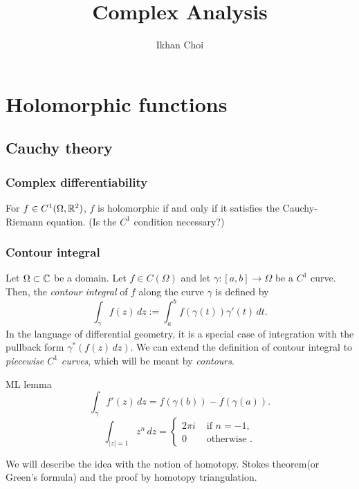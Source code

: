 \documentclass{../note}
\begin{document}
\title{Complex Analysis}
\author{Ikhan Choi}
\maketitle
\tableofcontents


\part{Holomorphic functions}


\chapter{Cauchy theory}
\section{Complex differentiability}


\begin{prb}
\begin{parts}
\item For $f\in C^1(\Omega,\mathbb{R}^2)$, $f$ is holomorphic if and only if it satisfies the Cauchy-Riemann equation. (Is the $C^1$ condition necessary?)
\end{parts}
\end{prb}


\section{Contour integral}

\begin{prb}
Let $\Omega\subset\mathbb{C}$ be a domain.
Let $f\in C(\Omega)$ and let $\gamma:[a,b]\to\Omega$ be a $C^1$ curve.
Then, the \emph{contour integral} of $f$ along the curve $\gamma$ is defined by
\[\int_\gamma f(z)\,dz:=\int_a^bf(\gamma(t))\gamma'(t)\,dt.\]
In the language of differential geometry, it is a special case of integration with the pullback form $\gamma^*(f(z)\,dz)$.
We can extend the definition of contour integral to \emph{piecewise $C^1$ curves}, which will be meant by \emph{contours}.
\end{prb}
ML lemma
\[\int_\gamma f'(z)\,dz=f(\gamma(b))-f(\gamma(a)).\]
\[\int_{|z|=1}z^n\,dz=\begin{cases}2\pi i&\text{ if }n=-1,\\0&\text{ otherwise }.\end{cases}\]

\begin{prb}
We will describe the idea with the notion of homotopy.
Stokes theorem(or Green's formula) and the proof by homotopy triangulation.
\end{prb}
\end{document}
